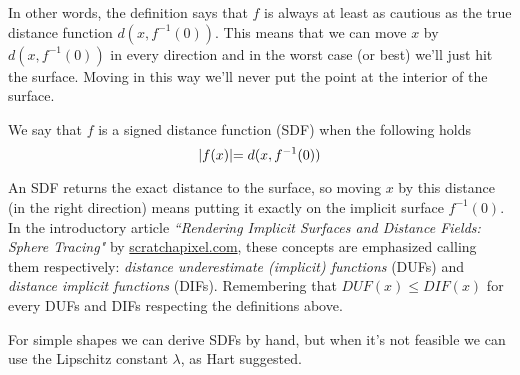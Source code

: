 \noindent
In other words, the definition says that $f$ is always at least as cautious as the true distance function $d(x,f^{-1}(0))$.
This means that we can move $x$ by $d(x,f^{-1}(0))$ in every direction and in the worst case (or best) we'll just hit the surface.
Moving in this way we'll never put the point at the interior of the surface.

\begin{definition}
We say that $f$ is a signed distance function (SDF) when the following holds
\begin{equation}\label{eq:sdf}
\lvert f(x) \lvert = d(x,f^{-1}(0))
\end{equation}
\end{definition}

\noindent
An SDF returns the exact distance to the surface, so moving $x$ by this distance (in the right direction) means putting it exactly on the implicit surface $f^{-1}(0)$.
In the introductory article
\emph{``Rendering Implicit Surfaces and Distance Fields: Sphere Tracing"}\cite{scratch_sdf}
by \url{scratchapixel.com},
these concepts are emphasized calling them respectively: 
\emph{distance underestimate (implicit) functions} (DUFs) and 
\emph{distance implicit functions} (DIFs).
Remembering that $DUF(x) \leq DIF(x)$ for every DUFs and DIFs respecting the definitions above.


For simple shapes we can derive SDFs by hand, but when it's not feasible we can use the Lipschitz constant $\lambda$, as Hart\cite{hart1996} suggested.

